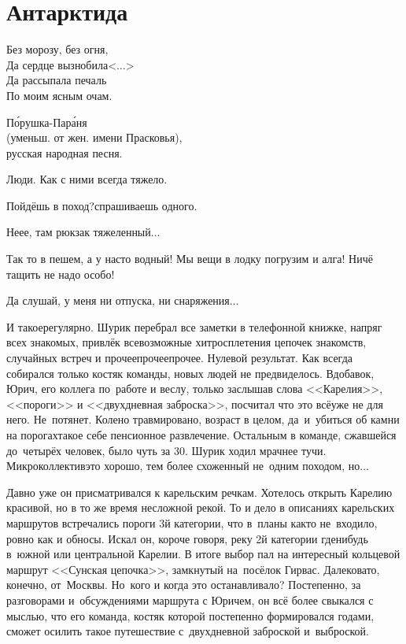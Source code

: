 {
	\chapter{Антарктида}
	\vepsianrose
	
	\fancyhead[LE]{\fancyplain{}{\bfseries \parttitle}}
	\fancyhead[RO]{\fancyplain{}{\bfseries \rightmark}}
	
	\epigraph{%
		Без морозу, без огня,\\
		Да сердце вызнобила<$\ldots$>\\
		Да рассыпала печаль\\
		По моим ясным очам.
	}	
	{
		\begin{flushright}
			\small{П\'орушка-Пар\'аня\\(уменьш. от жен. имени Прасковья),\\русская народная песня.}
		\end{flushright}
	}
	
	Люди. Как с ними всегда тяжело.
	
	\diagdash Пойдёшь в поход?\mdash спрашиваешь одного.
	
	\diagdash Не\sdash е\sdash е, там рюкзак тяжеленный$\ldots$
	
	\diagdash Так то в пешем, а у нас\sdash то водный! Мы вещи в лодку погрузим и алга! Ничё тащить не надо особо!
	
	\diagdash Да слушай, у меня ни отпуска, ни снаряжения$\ldots$
	
	И такое\mdash регулярно. Шурик перебрал все заметки в телефонной книжке, напряг всех знакомых, привлёк всевозможные хитросплетения цепочек знакомств, случайных встреч и прочее\sdash прочее\sdash прочее. Нулевой результат. Как всегда собирался только костяк команды, новых людей не предвиделось. Вдобавок, Юрич, его коллега по~работе и веслу, только заслышав слова <<Карелия>>, <<пороги>> и <<двухдневная заброска>>, посчитал что это всё\mdash уже не для него. Не~потянет. Колено травмировано, возраст в целом, да~и~убиться об камни на порогах\mdash такое себе пенсионное развлечение. Остальным в команде, сжавшейся до~четырёх человек, было чуть за 30. Шурик ходил мрачнее тучи. Микроколлектив\mdash это хорошо, тем более схоженный не~одним походом, но$\ldots$
	
	Давно уже он присматривался к карельским речкам. Хотелось открыть Карелию красивой, но в то же время несложной рекой. То и дело в описаниях карельских маршрутов встречались пороги 3\sdash й категории, что в~планы как\sdash то не~входило, ровно как и обносы. Искал он, короче говоря, реку 2\sdash й категории где\sdash нибудь в~южной или центральной Карелии. В итоге выбор пал на интересный кольцевой маршрут <<Сунская цепочка>>, замкнутый на~посёлок Гирвас. Далековато, конечно, от~Москвы. Но~кого и когда это останавливало? Постепенно, за разговорами и~обсуждениями маршрута с Юричем, он всё более свыкался с мыслью, что его команда, костяк которой постепенно формировался годами, сможет осилить такое путешествие с~двухдневной заброской и~выброской. 
	
}
